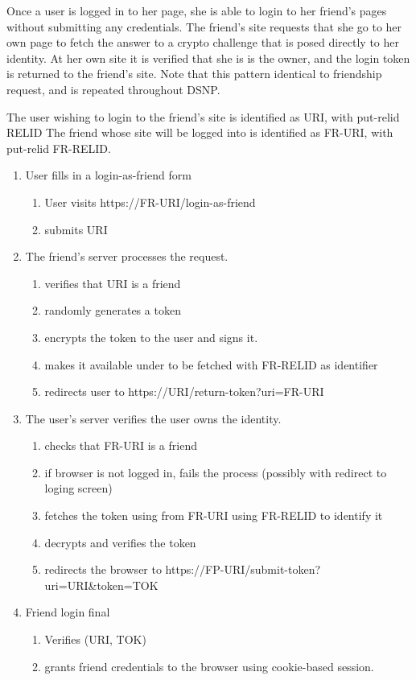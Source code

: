 \documentclass[letterpaper,11pt,oneside]{article}
\begin{document}
Once a user is logged in to her page, she is able to login to her friend's
pages without submitting any credentials. The friend's site requests that she
go to her own page to fetch the answer to a crypto challenge that is posed
directly to her identity. At her own site it is verified that she is is the
owner, and the login token is returned to the friend's site. Note that this
pattern identical to friendship request, and is repeated throughout DSNP.

The user wishing to login to the friend's site is identified as URI, with
put-relid RELID The friend whose site will be logged into is identified as
FR-URI, with put-relid FR-RELID.

\begin{enumerate}
\item User fills in a login-as-friend form
    \begin{enumerate}
    \item User visits https://FR-URI/login-as-friend
    \item submits URI
    \end{enumerate}

\item The friend's server processes the request.
    \begin{enumerate}
    \item verifies that URI is a friend
    \item randomly generates a token
    \item encrypts the token to the user and signs it.
    \item makes it available under to be fetched with FR-RELID as identifier
    \item redirects user to https://URI/return-token?uri=FR-URI
    \end{enumerate}

\item  The user's server verifies the user owns the identity.
    \begin{enumerate}
    \item checks that FR-URI is a friend
    \item if browser is not logged in, fails the process
            (possibly with redirect to loging screen)
    \item fetches the token using from FR-URI using FR-RELID to identify it
    \item decrypts and verifies the token
    \item redirects the browser to https://FP-URI/submit-token?uri=URI\&token=TOK
    \end{enumerate}

\item Friend login final
    \begin{enumerate}
    \item Verifies (URI, TOK)
    \item grants friend credentials to the browser using cookie-based session.
    \end{enumerate}
\end{enumerate}
\end{document}
